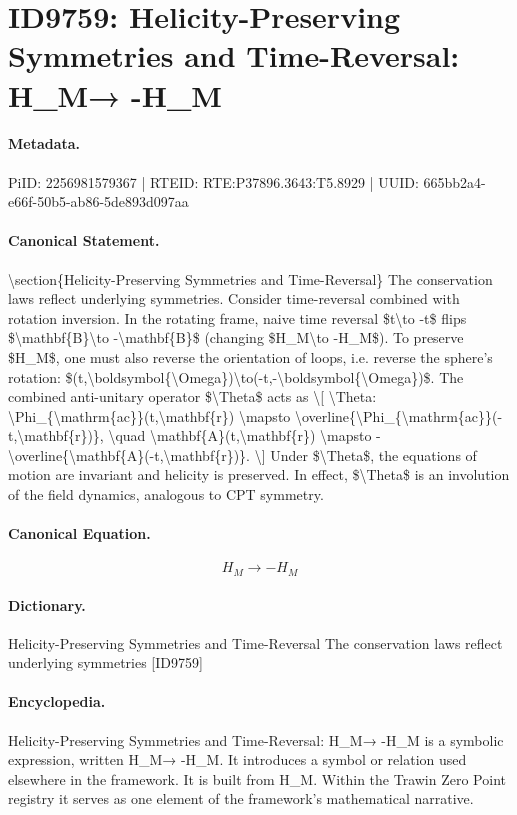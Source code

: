 \section*{ID9759: Helicity-Preserving Symmetries and Time-Reversal: H\_M→ -H\_M}
\paragraph{Metadata.}
PiID: 2256981579367 | RTEID: RTE:P37896.3643:T5.8929 | UUID: 665bb2a4-e66f-50b5-ab86-5de893d097aa

\paragraph{Canonical Statement.}
\textbackslash{}section\{Helicity-Preserving Symmetries and Time-Reversal\} The conservation laws reflect underlying symmetries. Consider time-reversal combined with rotation inversion. In the rotating frame, naive time reversal \$t\textbackslash{}to -t\$ flips \$\textbackslash{}mathbf\{B\}\textbackslash{}to -\textbackslash{}mathbf\{B\}\$ (changing \$H\_M\textbackslash{}to -H\_M\$). To preserve \$H\_M\$, one must also reverse the orientation of loops, i.e. reverse the sphere's rotation: \$(t,\textbackslash{}boldsymbol\{\textbackslash{}Omega\})\textbackslash{}to(-t,-\textbackslash{}boldsymbol\{\textbackslash{}Omega\})\$. The combined anti-unitary operator \$\textbackslash{}Theta\$ acts as \textbackslash{}[ \textbackslash{}Theta: \textbackslash{}Phi\_\{\textbackslash{}mathrm\{ac\}\}(t,\textbackslash{}mathbf\{r\}) \textbackslash{}mapsto \textbackslash{}overline\{\textbackslash{}Phi\_\{\textbackslash{}mathrm\{ac\}\}(-t,\textbackslash{}mathbf\{r\})\}, \textbackslash{}quad \textbackslash{}mathbf\{A\}(t,\textbackslash{}mathbf\{r\}) \textbackslash{}mapsto -\textbackslash{}overline\{\textbackslash{}mathbf\{A\}(-t,\textbackslash{}mathbf\{r\})\}. \textbackslash{}] Under \$\textbackslash{}Theta\$, the equations of motion are invariant and helicity is preserved. In effect, \$\textbackslash{}Theta\$ is an involution of the field dynamics, analogous to CPT symmetry.

\paragraph{Canonical Equation.}
\[
H_M\to -H_M
\]

\paragraph{Dictionary.}
Helicity-Preserving Symmetries and Time-Reversal The conservation laws reflect underlying symmetries [ID9759]

\paragraph{Encyclopedia.}
Helicity-Preserving Symmetries and Time-Reversal: H\_M→ -H\_M is a symbolic expression, written H\_M→ -H\_M. It introduces a symbol or relation used elsewhere in the framework. It is built from H\_M. Within the Trawin Zero Point registry it serves as one element of the framework's mathematical narrative.
